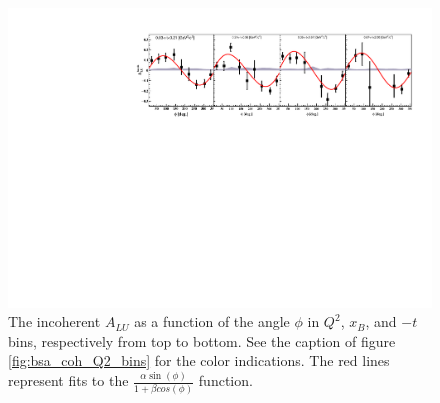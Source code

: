 \begin{figure}[tpb]
\includegraphics[scale=0.9]{fig_Dec2016/ALU_phi_p_t.pdf}
\caption{The incoherent $A_{LU}$ as a function of the angle $\phi$ in $Q^2$, 
   $x_B$, and $-t$ bins, respectively from top to bottom. See the caption of 
   figure \ref{fig:bsa_coh_Q2_bins} for the color indications. The red lines 
   represent fits to the $\frac{\alpha \sin(\phi)}{1 + \beta cos(\phi)}$ 
   function.  } \label{fig:bsa_incoh_bins}
\end{figure}

